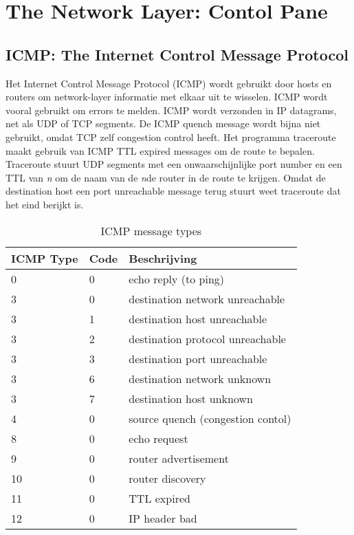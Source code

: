 \section{The Network Layer: Contol Pane}
\subsection{ICMP: The Internet Control Message Protocol}
Het Internet Control Message Protocol (ICMP) wordt gebruikt door hosts en routers om network-layer informatie met elkaar uit te wisselen. 
ICMP wordt vooral gebruikt om errors te melden.
ICMP wordt verzonden in IP datagrams, net als UDP of TCP segments. 
De ICMP quench message wordt bijna niet gebruikt, omdat TCP zelf congestion control heeft.\newline
Het programma traceroute maakt gebruik van ICMP TTL expired messages om de route te bepalen. Traceroute stuurt UDP segments met een onwaarschijnlijke port number en een TTL van \textit{n} om de naam van de \textit{n}de router in de route te krijgen. 
Omdat de destination host een port unreachable message terug stuurt weet traceroute dat het eind berijkt is.

\begin{table}[h!]
  \begin{center}
    \caption{ICMP message types}
    \label{tab:ICMP}
    \begin{tabular}{l l l}
      \textbf{ICMP Type} & \textbf{Code} & \textbf{Beschrijving}\\
      \hline
      0 & 0 & echo reply (to ping)\\ \hline
      3 & 0 & destination network unreachable\\ \hline
      3 & 1 & destination host unreachable\\ \hline
      3 & 2 & destination protocol unreachable\\ \hline
      3 & 3 & destination port unreachable\\ \hline
      3 & 6 & destination network unknown\\ \hline
      3 & 7 & destination host unknown\\ \hline
      4 & 0 & source quench (congestion contol)\\ \hline
      8 & 0 & echo request\\ \hline
      9 & 0 & router advertisement\\ \hline
      10 & 0 & router discovery\\ \hline
      11 & 0 & TTL expired\\ \hline
      12 & 0 & IP header bad\\ \hline

    \end{tabular}
  \end{center}
\end{table}
